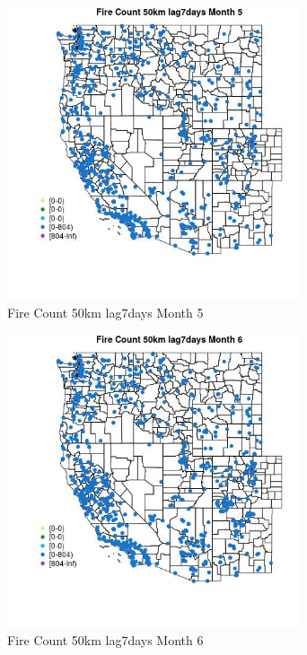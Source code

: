 \begin{figure} 
\centering  
\includegraphics[width=0.77\textwidth]{Code_Outputs/Report_ML_input_PM25_Step4_part_f_de_duplicated_aves_prioritize_24hr_obswNAs_MapObsMo5Fire_Count_50km_lag7days.jpg} 
\caption{\label{fig:Report_ML_input_PM25_Step4_part_f_de_duplicated_aves_prioritize_24hr_obswNAsMapObsMo5Fire_Count_50km_lag7days}Fire Count 50km lag7days Month 5} 
\end{figure} 
 

\begin{figure} 
\centering  
\includegraphics[width=0.77\textwidth]{Code_Outputs/Report_ML_input_PM25_Step4_part_f_de_duplicated_aves_prioritize_24hr_obswNAs_MapObsMo6Fire_Count_50km_lag7days.jpg} 
\caption{\label{fig:Report_ML_input_PM25_Step4_part_f_de_duplicated_aves_prioritize_24hr_obswNAsMapObsMo6Fire_Count_50km_lag7days}Fire Count 50km lag7days Month 6} 
\end{figure} 
 

